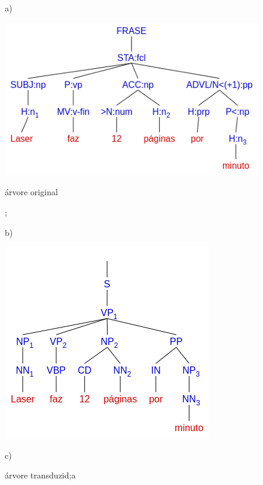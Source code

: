 \begin{figure}[!ht]
    \centering
    a)
    \begin{minipage}{.45\textwidth}
        \includegraphics[width=\linewidth]{imagens/ec_bosque_sem_ponto_tree_orig.png}
        \caption{árvore original};
    \end{minipage}
    b)
    \begin{minipage}{.45\textwidth}
        \includegraphics[width=\linewidth]{imagens/ec_bosque_sem_ponto_tree_trans.png}
        \caption{árvore transduzid;a}
    \end{minipage}
    c)
    \begin{minipage}{.45\textwidth}

\end{minipage}
\end{figure}
